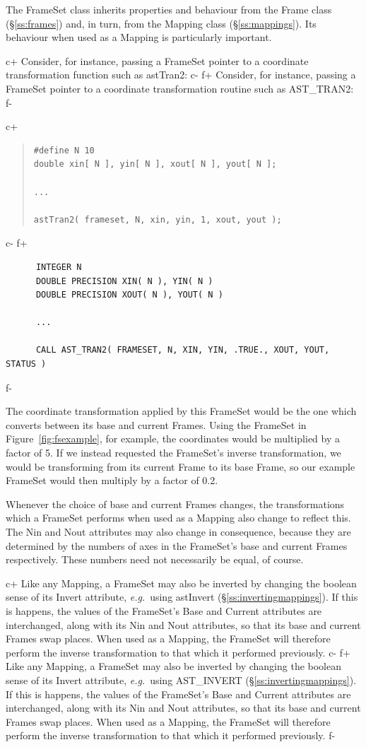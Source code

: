 \documentclass[twoside,11pt]{article}
\newcommand{\secref}[1]{\S\ref{#1}}
\newcommand{\secref}[1]{\ref{#1}}
\begin{document}
The FrameSet class inherits properties and behaviour from the Frame
class (\secref{ss:frames}) and, in turn, from the Mapping class
(\secref{ss:mappings}). Its behaviour when used as a Mapping is
particularly important.

c+
Consider, for instance, passing a FrameSet pointer to a coordinate
transformation function such as astTran2:
c-
f+
Consider, for instance, passing a FrameSet pointer to a coordinate
transformation routine such as AST\_TRAN2:
f-

c+
\begin{quote}
\small
\begin{verbatim}
#define N 10
double xin[ N ], yin[ N ], xout[ N ], yout[ N ];

...

astTran2( frameset, N, xin, yin, 1, xout, yout );
\end{verbatim}
\normalsize
\end{quote}
c-
f+
\small
\begin{verbatim}
      INTEGER N
      DOUBLE PRECISION XIN( N ), YIN( N )
      DOUBLE PRECISION XOUT( N ), YOUT( N )

      ...

      CALL AST_TRAN2( FRAMESET, N, XIN, YIN, .TRUE., XOUT, YOUT, STATUS )
\end{verbatim}
\normalsize
f-

The coordinate transformation applied by this FrameSet would be the
one which converts between its base and current Frames. Using the
FrameSet in Figure~\ref{fig:fsexample}, for example, the coordinates
would be multiplied by a factor of 5.  If we instead requested the
FrameSet's inverse transformation, we would be transforming from its
current Frame to its base Frame, so our example FrameSet would then
multiply by a factor of 0.2.

Whenever the choice of base and current Frames changes, the
transformations which a FrameSet performs when used as a Mapping also
change to reflect this. The Nin and Nout attributes may also change in
consequence, because they are determined by the numbers of axes in the
FrameSet's base and current Frames respectively. These numbers need
not necessarily be equal, of course.

c+
Like any Mapping, a FrameSet may also be inverted by changing the
boolean sense of its Invert attribute, {\em{e.g.}}\ using astInvert
(\secref{ss:invertingmappings}). If this is happens, the values of the
FrameSet's Base and Current attributes are interchanged, along with
its Nin and Nout attributes, so that its base and current Frames swap
places. When used as a Mapping, the FrameSet will therefore perform
the inverse transformation to that which it performed previously.
c-
f+
Like any Mapping, a FrameSet may also be inverted by changing the
boolean sense of its Invert attribute, {\em{e.g.}}\ using AST\_INVERT
(\secref{ss:invertingmappings}). If this is happens, the values of the
FrameSet's Base and Current attributes are interchanged, along with
its Nin and Nout attributes, so that its base and current Frames swap
places. When used as a Mapping, the FrameSet will therefore perform
the inverse transformation to that which it performed previously.
f-
\end{document}
